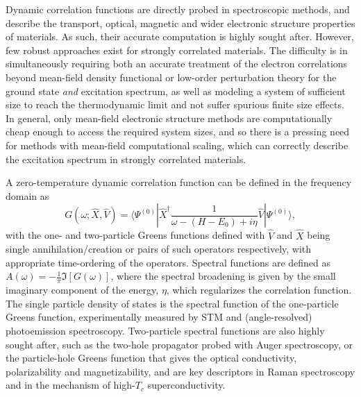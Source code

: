 \documentclass[aps,twocolumn,nobibnotes]{revtex4}
\begin{document}
Dynamic correlation functions are directly probed in spectroscopic methods,
and describe the transport, optical, magnetic and wider electronic structure properties of materials. 
As such, their accurate computation is highly sought after. 
However, few robust approaches exist for strongly correlated materials\cite{Gali2013}. The difficulty is in simultaneously requiring both an accurate 
treatment of the electron correlations beyond mean-field density functional or low-order perturbation theory for the ground state {\em and} excitation spectrum, as well as modeling 
a system of sufficient size to reach the thermodynamic limit and not suffer spurious finite size effects. 
In general, only mean-field electronic structure methods are computationally cheap enough to access the required system
sizes, and so there is a pressing need for methods with mean-field computational scaling, which can correctly describe 
the excitation spectrum in strongly correlated materials.

A zero-temperature dynamic correlation function can be defined in the frequency domain as
\begin{equation}
    G(\omega;{\hat X},{\hat V}) = \langle \Psi^{(0)} | {\hat X}^{\dagger} \frac{1}{\omega-(H-E_0)+i \eta} {\hat V} | \Psi^{(0)} \rangle , \label{eqn:intCorrFunc}
\end{equation}
with the one- and two-particle Greens functions defined with ${\hat V}$ and ${\hat X}$ being single annihilation/creation or pairs of such operators 
respectively, with appropriate time-ordering of the operators. Spectral functions are defined as $A(\omega)=-\frac{1}{\pi}\Im[G(\omega)]$,
where the spectral broadening is given by the small imaginary component of the energy, $\eta$, which regularizes the correlation function. The single particle
density of states is the spectral function of the one-particle Greens function, experimentally measured by STM 
and (angle-resolved) photoemission spectroscopy. Two-particle spectral functions are also highly sought after, such as the two-hole propagator 
probed with Auger spectroscopy\cite{Mona2013}, or the particle-hole Greens function that gives the optical conductivity, polarizability and
magnetizability, and are key descriptors in 
Raman spectroscopy and in the mechanism of high-$T_c$ superconductivity\cite{Millis2012,Sordi2012,Millis2013}.
\end{document}
